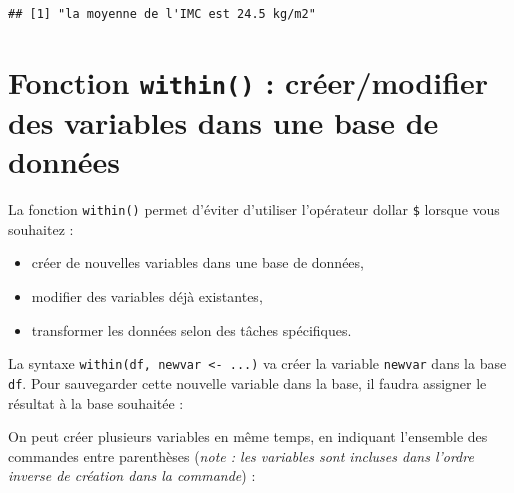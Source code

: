\documentclass[
]{book}
\newenvironment{Shaded}{\begin{snugshade}}{\end{snugshade}}
\newcommand{\AttributeTok}[1]{\textcolor[rgb]{0.13,0.29,0.53}{#1}}
\newcommand{\CommentTok}[1]{\textcolor[rgb]{0.56,0.35,0.01}{\textit{#1}}}
\newcommand{\DocumentationTok}[1]{\textcolor[rgb]{0.56,0.35,0.01}{\textbf{\textit{#1}}}}
\newcommand{\FunctionTok}[1]{\textcolor[rgb]{0.13,0.29,0.53}{\textbf{#1}}}
\newcommand{\NormalTok}[1]{#1}
\newcommand{\OtherTok}[1]{\textcolor[rgb]{0.56,0.35,0.01}{#1}}
\newcommand{\SpecialCharTok}[1]{\textcolor[rgb]{0.81,0.36,0.00}{\textbf{#1}}}
\newcommand{\StringTok}[1]{\textcolor[rgb]{0.31,0.60,0.02}{#1}}
\providecommand{\tightlist}{%
  \setlength{\itemsep}{0pt}\setlength{\parskip}{0pt}}
\begin{document}
\begin{verbatim}
## [1] "la moyenne de l'IMC est 24.5 kg/m2"
\end{verbatim}

\section{\texorpdfstring{Fonction \texttt{within()} : créer/modifier des variables dans une base de données}{Fonction within() : créer/modifier des variables dans une base de données}}\label{fonction-within-cruxe9ermodifier-des-variables-dans-une-base-de-donnuxe9es}

La fonction \texttt{within()} permet d'éviter d'utiliser l'opérateur dollar \texttt{\$} lorsque vous souhaitez :

\begin{itemize}
\tightlist
\item
  créer de nouvelles variables dans une base de données,
\item
  modifier des variables déjà existantes,
\item
  transformer les données selon des tâches spécifiques.
\end{itemize}

La syntaxe \texttt{within(df,\ newvar\ \textless{}-\ ...)} va créer la variable \texttt{newvar} dans la base \texttt{df}. Pour sauvegarder cette nouvelle variable dans la base, il faudra assigner le résultat à la base souhaitée :

\begin{Shaded}
\end{Shaded}

On peut créer plusieurs variables en même temps, en indiquant l'ensemble des commandes entre parenthèses (\emph{note : les variables sont incluses dans l'ordre inverse de création dans la commande}) :
\end{document}

